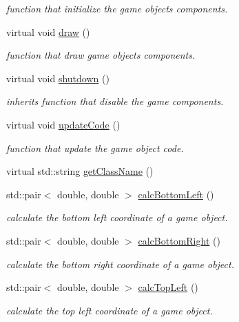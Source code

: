 \begin{DoxyCompactItemize}
\begin{DoxyCompactList}\small\item\em function that initialize the game objects components. \end{DoxyCompactList}\item 
virtual void \hyperlink{classengine_1_1_game_object_abb64143e72358beb808db22182517802}{draw} ()
\begin{DoxyCompactList}\small\item\em function that draw game objects components. \end{DoxyCompactList}\item 
virtual void \hyperlink{classengine_1_1_game_object_a08d7a48b6eb90f55c8b670b6f98ab393}{shutdown} ()
\begin{DoxyCompactList}\small\item\em inherits function that disable the game components. \end{DoxyCompactList}\item 
virtual void \hyperlink{classengine_1_1_game_object_ac008ad125b3192f0114af78549f6d829}{update\+Code} ()
\begin{DoxyCompactList}\small\item\em function that update the game object code. \end{DoxyCompactList}\item 
virtual std\+::string \hyperlink{classengine_1_1_game_object_ac836deb7933c725ac09b67386ad10239}{get\+Class\+Name} ()
\item 
std\+::pair$<$ double, double $>$ \hyperlink{classengine_1_1_game_object_a615683282d234126169ab8c004c804aa}{calc\+Bottom\+Left} ()
\begin{DoxyCompactList}\small\item\em calculate the bottom left coordinate of a game object. \end{DoxyCompactList}\item 
std\+::pair$<$ double, double $>$ \hyperlink{classengine_1_1_game_object_a804740468e962005e912fb7f5905e5e7}{calc\+Bottom\+Right} ()
\begin{DoxyCompactList}\small\item\em calculate the bottom right coordinate of a game object. \end{DoxyCompactList}\item 
std\+::pair$<$ double, double $>$ \hyperlink{classengine_1_1_game_object_aa1a0d2f7da78692acb1e8e1fde9a7743}{calc\+Top\+Left} ()
\begin{DoxyCompactList}\small\item\em calculate the top left coordinate of a game object. \end{DoxyCompactList}\item 

\end{DoxyCompactItemize}

